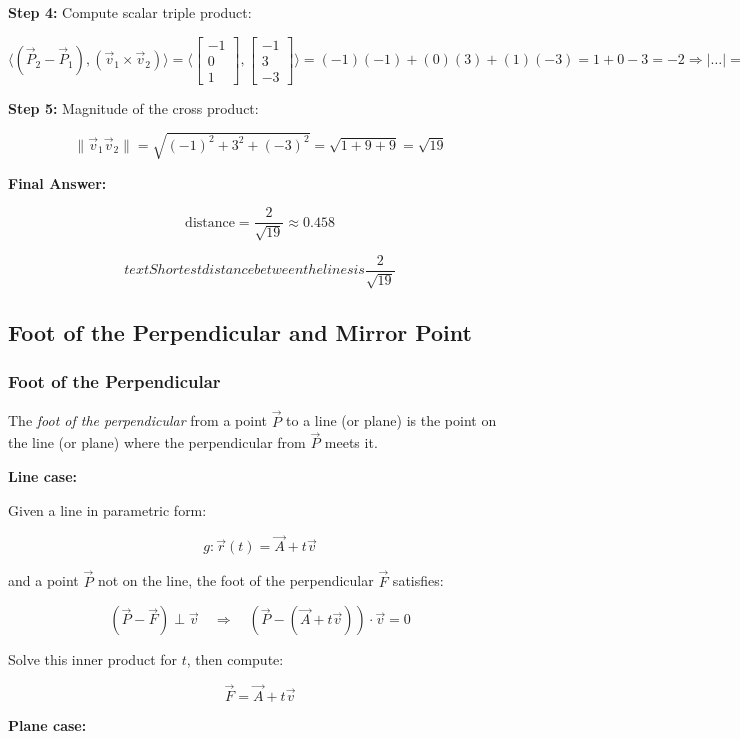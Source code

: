 \textbf{Step 4:} Compute scalar triple product:

\[
	\langle(\vec{P}_2 - \vec{P}_1), (\vec{v}_1 \times \vec{v}_2)\rangle =
	\langle\begin{bmatrix} -1 \\ 0 \\ 1 \end{bmatrix}, \begin{bmatrix} -1 \\ 3 \\ -3 \end{bmatrix}\rangle
	= (-1)(-1) + (0)(3) + (1)(-3) = 1 + 0 - 3 = -2
	\Rightarrow |\dots| = 2
\]

\textbf{Step 5:} Magnitude of the cross product:

\[
	\|\vec{v}_1  \vec{v}_2\|= \sqrt{(-1)^2 + 3^2 + (-3)^2} = \sqrt{1 + 9 + 9} = \sqrt{19}
\]

\textbf{Final Answer:}

\[
	\text{distance} = \frac{2}{\sqrt{19}} \approx 0.458
\]

\[
text{Shortest distance between the lines is } \frac{2}{\sqrt{19}}
\]

\subsection{Foot of the Perpendicular and Mirror Point}

\subsubsection{Foot of the Perpendicular}

The \emph{foot of the perpendicular} from a point \(\vec{P}\) to a line (or plane) is the point on the line (or plane) where the perpendicular from \(\vec{P}\) meets it.

\textbf{Line case:}

Given a line in parametric form:

\[
	g: \vec{r}(t) = \vec{A} + t\vec{v}
\]

and a point \(\vec{P}\) not on the line, the foot of the perpendicular \(\vec{F}\) satisfies:

\[
	(\vec{P} - \vec{F}) \perp \vec{v} \quad \Rightarrow \quad (\vec{P} - (\vec{A} + t\vec{v})) \cdot \vec{v} = 0
\]

Solve this inner product for \(t\), then compute:

\[
	\vec{F} = \vec{A} + t\vec{v}
\]

\textbf{Plane case:}

